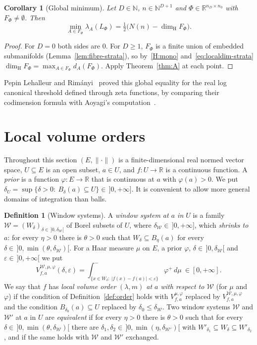 \documentclass[11pt,a4paper]{article}
\newtheorem{corollary}[theorem]{Corollary}
\theoremstyle{definition}
\newtheorem{definition}[theorem]{Definition}
\theoremstyle{remark}
\numberwithin{equation}{section}
\newcommand{\N}{\mathbb{N}}
\newcommand{\R}{\mathbb{R}}
\newcommand{\dimH}{\dim_{\mathrm{H}}}
\newcommand{\norm}[1]{\lVert #1\rVert}
\newcommand{\abs}[1]{\lvert #1\rvert}
\newcommand{\eps}{\varepsilon}
\begin{document}
\begin{corollary}[Global minimum]\label{cor:global}
Let $D\in\N$, $n\in\N^{D+1}$ and $\Phi\in\R^{n_D\times n_0}$ with $F_\Phi\neq\emptyset$. Then
\[
\min_{A\in F_\Phi}\lambda_A(L_\Phi)=\tfrac12\bigl(N(n)-\dimH F_\Phi\bigr).
\]
\end{corollary}
\begin{proof}
For $D=0$ both sides are $0$. For $D\ge1$, $F_\Phi$ is a finite union of embedded submanifolds (Lemma~\ref{lem:fibre-strata}), so by~\ref{H:mono} and~\eqref{eq:localdim-strata} $\dimH F_\Phi=\max_{A\in F_\Phi}d_A(F_\Phi)$. Apply Theorem~\ref{thm:A} at each point.
\end{proof}
Pepin Lehalleur and Rimányi~\cite{lehalleur-rimanyi} proved this global equality for the real log canonical threshold defined through zeta functions, by comparing their codimension formula with Aoyagi's computation~\cite{aoyagi-2024}.
\section{Local volume orders}\label{sec:volume}

Throughout this section $(E,\norm\cdot)$ is a finite-dimensional real normed vector space, $U\subseteq E$ is an open subset, $a\in U$, and $f:U\to\R$ is a continuous function. A \emph{prior} is a function $\varphi:E\to\R$ that is continuous at $a$ with $\varphi(a)>0$. We put $\delta_U=\sup\{\delta>0:\ B_\delta(a)\subseteq U\}\in\,]0,+\infty]$. It is convenient to allow more general domains of integration than balls.

\begin{definition}[Window systems]\label{def:windows}
A \emph{window system at $a$ in $U$} is a family $\mathcal W=(W_\delta)_{\delta\in\,]0,\delta_{\mathcal W}[}$ of Borel subsets of $U$, where $\delta_{\mathcal W}\in\,]0,+\infty]$, which \emph{shrinks to $a$}: for every $\eta>0$ there is $\theta>0$ such that $W_\delta\subseteq B_\eta(a)$ for every $\delta\in\,]0,\min(\theta,\delta_{\mathcal W})[$. For a Haar measure $\mu$ on $E$, a prior $\varphi$, $\delta\in\,]0,\delta_{\mathcal W}[$ and $\eps\in\,]0,+\infty[$ we put
\[
V^{\mathcal W,\mu,\varphi}_{f,a}(\delta,\eps)=\int^-_{\{x\in W_\delta:\ \abs{f(x)-f(a)}<\eps\}}\varphi^+\,d\mu\ \in[0,+\infty].
\]
We say that $f$ has \emph{local volume order $(\lambda,m)$ at $a$ with respect to $\mathcal W$} (for $\mu$ and $\varphi$) if the condition of Definition~\ref{def:order} holds with $V^{\mu,\varphi}_{f,a}$ replaced by $V^{\mathcal W,\mu,\varphi}_{f,a}$ and the condition $B_{\delta_0}(a)\subseteq U$ replaced by $\delta_0\le\delta_{\mathcal W}$. Two window systems $\mathcal W$ and $\mathcal W'$ at $a$ in $U$ are \emph{equivalent} if for every $\eta>0$ there is $\theta>0$ such that for every $\delta\in\,]0,\min(\theta,\delta_{\mathcal W})[$ there are $\delta_1,\delta_2\in\,]0,\min(\eta,\delta_{\mathcal W'})[$ with $W'_{\delta_1}\subseteq W_\delta\subseteq W'_{\delta_2}$, and if the same holds with $\mathcal W$ and $\mathcal W'$ exchanged.
\end{definition}
\end{document}
